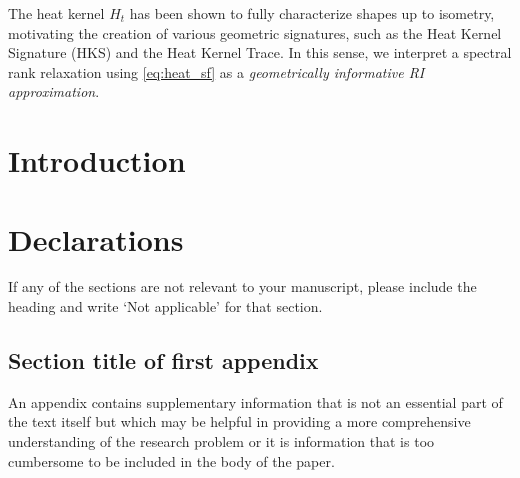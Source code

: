 \documentclass[pdflatex,sn-mathphys-num]{sn-jnl}
\begin{document}
The heat kernel \(H_{t}\) has been shown to fully characterize shapes up to isometry, motivating the creation of various geometric signatures, such as the Heat Kernel Signature (HKS) and the Heat Kernel Trace. In this sense, we interpret a spectral rank relaxation using \ref{eq:heat_sf} as a \emph{geometrically informative RI approximation}.


\section{Introduction}\label{sec1}

\backmatter

\section*{Declarations}

%

\noindent
If any of the sections are not relevant to your manuscript, please include the heading and write `Not applicable' for that section. 

\begin{appendices}

\section{Section title of first appendix}\label{secA1}

An appendix contains supplementary information that is not an essential part of the text itself but which may be helpful in providing a more comprehensive understanding of the research problem or it is information that is too cumbersome to be included in the body of the paper.

\end{appendices}


\end{document}
